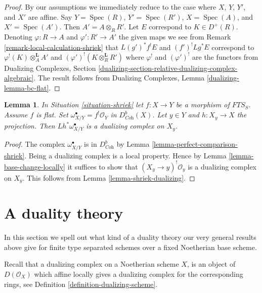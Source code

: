 \documentclass{stacks-project}
\theoremstyle{plain}
\newtheorem{lemma}[subsection]{Lemma}
\theoremstyle{definition}
\theoremstyle{remark}
\numberwithin{equation}{subsection}
\def\Spec{\mathop{\mathrm{Spec}}}
\begin{document}
\begin{proof}
By our assumptions we immediately reduce to the case where
$X$, $Y$, $Y'$, and $X'$ are affine.
Say $Y = \Spec(R)$, $Y' = \Spec(R')$, $X = \Spec(A)$, and $X' = \Spec(A')$.
Then $A' = A \otimes_R R'$. Let
$E$ correspond to $K \in D^+(R)$.
Denoting $\varphi : R \to A$ and $\varphi' : R' \to A'$
the given maps we see from
Remark \ref{remark-local-calculation-shriek}
that $L(g')^*f^!E$ and $(f')^!Lg^*E$ correspond to
$\varphi^!(K) \otimes_A^\mathbf{L} A'$ and
$(\varphi')^!(K \otimes_R^\mathbf{L} R')$
where $\varphi^!$ and $(\varphi')^!$ are the functors from
Dualizing Complexes, Section
\ref{dualizing-section-relative-dualizing-complex-algebraic}.
The result follows from
Dualizing Complexes, Lemma \ref{dualizing-lemma-bc-flat}.
\end{proof}

\begin{lemma}
\label{lemma-relative-dualizing-fibres}
In Situation \ref{situation-shriek} let $f : X \to Y$ be a morphism of
$\textit{FTS}_S$. Assume $f$ is flat. Set
$\omega_{X/Y}^\bullet = f^!\mathcal{O}_Y$ in $D^b_{\textit{Coh}}(X)$.
Let $y \in Y$ and $h : X_y \to X$ the projection.
Then $Lh^*\omega_{X/Y}^\bullet$ is a dualizing complex
on $X_y$.
\end{lemma}

\begin{proof}
The complex $\omega_{X/Y}^\bullet$ is in $D^b_{\textit{Coh}}$
by Lemma \ref{lemma-perfect-comparison-shriek}.
Being a dualizing complex is a local property.
Hence by Lemma \ref{lemma-base-change-locally}
it suffices to show that $(X_y \to y)^!\mathcal{O}_y$
is a dualizing complex on $X_y$.
This follows from Lemma \ref{lemma-shriek-dualizing}.
\end{proof}








\section{A duality theory}
\label{section-duality}

\noindent
In this section we spell out what kind of a duality theory our very general
results above give for finite type separated schemes over a fixed
Noetherian base scheme.

\medskip\noindent
Recall that a dualizing complex on a Noetherian scheme $X$, is an
object of $D(\mathcal{O}_X)$ which affine locally gives a dualizing
complex for the corresponding rings, see
Definition \ref{definition-dualizing-scheme}.
\end{document}
